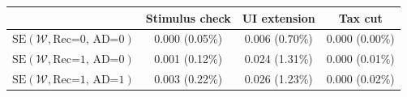 \begin{tabular}{@{}lccc@{}}
\toprule
                          & Stimulus check      & UI extension    & Tax cut    \\  \midrule
$\mathrm{SE}(\mathcal{W}, \text{Rec=0, AD=0})$ & 0.000 (0.05\%)  & 0.006 (0.70\%)  & 0.000 (0.00\%)     \\
$\mathrm{SE}(\mathcal{W}, \text{Rec=1, AD=0})$ & 0.001 (0.12\%)  & 0.024 (1.31\%)  & 0.000 (0.01\%)     \\
$\mathrm{SE}(\mathcal{W}, \text{Rec=1, AD=1})$ & 0.003 (0.22\%)  & 0.026 (1.23\%)  & 0.000 (0.02\%)     \\ \bottomrule
\end{tabular}
